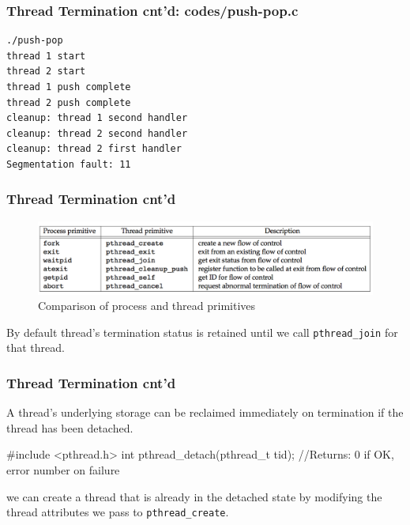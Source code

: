 \documentclass[newPxFont,sthlmFooter,nooffset]{beamer}
\begin{document}
\begin{frame}
  \frametitle{Thread Termination cnt'd: codes/push-pop.c }




\begin{verbatim}
./push-pop
thread 1 start
thread 2 start
thread 1 push complete
thread 2 push complete
cleanup: thread 1 second handler
cleanup: thread 2 second handler
cleanup: thread 2 first handler
Segmentation fault: 11
\end{verbatim}
\end{frame}


\begin{frame}[t]
  \frametitle{Thread Termination cnt'd}

  \begin{figure}[h]
    \centering
    \includegraphics[width=\linewidth]{figure/fig11-6}
    \caption{Comparison of process and thread primitives}
    \label{fig:work}
  \end{figure}

By default thread’s termination status is retained until we call \texttt{pthread\_join} for that thread.


\end{frame}

\begin{frame}[t,fragile]
  \frametitle{Thread Termination cnt'd}
  A thread’s underlying storage can be reclaimed immediately on termination if the thread has been detached.
  \begin{codedef}
#include <pthread.h>
int pthread_detach(pthread_t tid);
//Returns: 0 if OK, error number on failure
  \end{codedef}

we can create a thread that is already in the detached state by modifying the thread attributes we pass to \texttt{pthread\_create}.

\end{frame}
\end{document}
